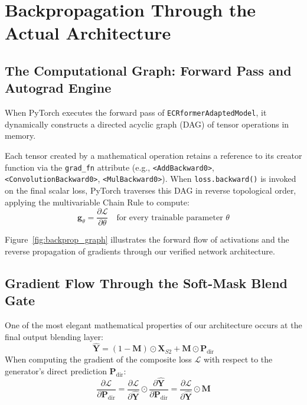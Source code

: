 \chapter{Backpropagation Through the Actual Architecture}
\label{chap:ch14}

\section{The Computational Graph: Forward Pass and Autograd Engine}
When PyTorch executes the forward pass of \texttt{ECRformerAdaptedModel}, it dynamically constructs a directed acyclic graph (DAG) of tensor operations in memory. 

Each tensor created by a mathematical operation retains a reference to its creator function via the \texttt{grad\_fn} attribute (e.g., \texttt{<AddBackward0>}, \texttt{<ConvolutionBackward0>}, \texttt{<MulBackward0>}). When \texttt{loss.backward()} is invoked on the final scalar loss, PyTorch traverses this DAG in reverse topological order, applying the multivariable Chain Rule to compute:
\begin{equation}
\mathbf{g}_\theta = \frac{\partial \mathcal{L}}{\partial \theta} \quad \text{for every trainable parameter } \theta
\end{equation}

Figure~\ref{fig:backprop_graph} illustrates the forward flow of activations and the reverse propagation of gradients through our verified network architecture.



\section{Gradient Flow Through the Soft-Mask Blend Gate}
One of the most elegant mathematical properties of our architecture occurs at the final output blending layer:
\begin{equation}
\hat{\mathbf{Y}} = (1 - \mathbf{M}) \odot \mathbf{X}_{S2} + \mathbf{M} \odot \mathbf{P}_{\text{dir}}
\end{equation}
When computing the gradient of the composite loss $\mathcal{L}$ with respect to the generator's direct prediction $\mathbf{P}_{\text{dir}}$:
\begin{equation}
\frac{\partial \mathcal{L}}{\partial \mathbf{P}_{\text{dir}}} = \frac{\partial \mathcal{L}}{\partial \hat{\mathbf{Y}}} \odot \frac{\partial \hat{\mathbf{Y}}}{\partial \mathbf{P}_{\text{dir}}} = \frac{\partial \mathcal{L}}{\partial \hat{\mathbf{Y}}} \odot \mathbf{M}
\end{equation}

